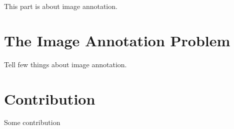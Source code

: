 This part is about image annotation.

\chapter{The Image Annotation Problem}%
\label{cha:the_image_annotation_problem}

Tell few things about image annotation.

\chapter{Contribution}%
\label{cha:contribution}

Some contribution
